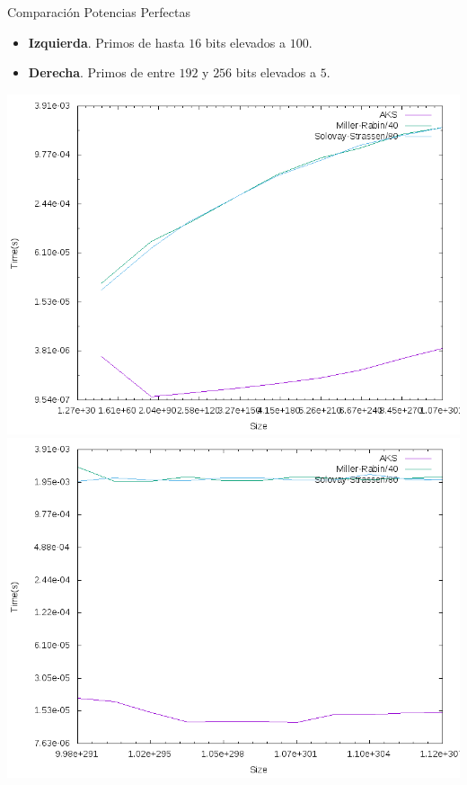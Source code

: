 \documentclass{beamer}
\begin{document}
\begin{frame}{Comparación Potencias Perfectas}
	\onslide<1->
	\begin{itemize}
		\item \textbf{Izquierda}. Primos de hasta $16$ bits elevados a $100$.
		
		\item \textbf{Derecha}. Primos de entre $192$ y $256$ bits elevados a $5$.
	\end{itemize}
	
	\begin{alertblock}{}
		\begin{center}
			\includegraphics[scale=0.27]{../Memoria/img/graphs/aks-probs-powers-100-mean}
			\includegraphics[scale=0.27]{../Memoria/img/graphs/aks-probs-powers-5-mean}
		\end{center}
	\end{alertblock}
\end{frame}
\end{document}

